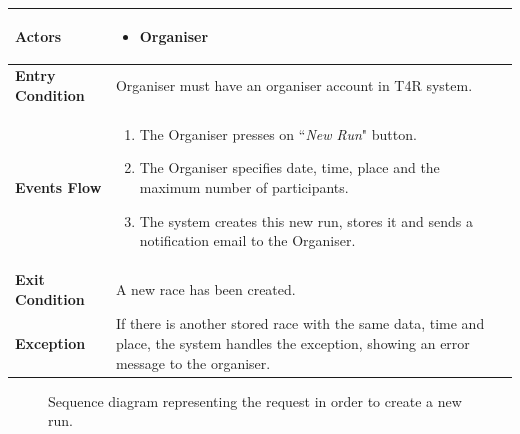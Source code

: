             \begin{table}[H]
            	\centering
                
                \begin{tabular}{|p{3cm}|p{8.2cm}|}
                    \hline
                    \textbf{Actors} & \begin{itemize}
                        \item Organiser
                    \end{itemize} \\
                     \hline
                    \textbf{Entry Condition} & Organiser must have an organiser account in T4R system.\\
                     \hline
                    \textbf{Events Flow} & \begin{enumerate}
                                                \item The Organiser presses on ``\emph{New Run}" button.
                                                \item The Organiser specifies date, time, place and the maximum number of participants.
                                                \item The system creates this new run, stores it and sends a notification email to the Organiser.
                                            \end{enumerate}\\
                     \hline
                    \textbf{Exit Condition} & A new race has been created.\\
                     \hline
                    \textbf{Exception} & If there is another stored race with the same data, time and place, the system                       handles the exception, showing an error message to the organiser. \\
                     \hline
                \end{tabular}  
            \end{table} 
            
            \begin{figure}[H]
                \centering
                \caption{Sequence diagram representing the request in order to create a new run.}
                \label{fig:T4R-run-organization}
            \end{figure}
            
